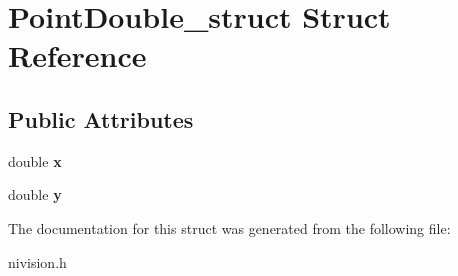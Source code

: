 \hypertarget{structPointDouble__struct}{
\section{PointDouble\_\-struct Struct Reference}
\label{structPointDouble__struct}
}
\subsection*{Public Attributes}
\begin{DoxyCompactItemize}
\item 
\hypertarget{structPointDouble__struct_a6d0ecf84eee110d2ea519a7551f57975}{
double {\bfseries x}}
\label{structPointDouble__struct_a6d0ecf84eee110d2ea519a7551f57975}

\item 
\hypertarget{structPointDouble__struct_ad4630b3fdb9ab500898778e7d4630256}{
double {\bfseries y}}
\label{structPointDouble__struct_ad4630b3fdb9ab500898778e7d4630256}

\end{DoxyCompactItemize}


The documentation for this struct was generated from the following file:\begin{DoxyCompactItemize}
\item 
nivision.h\end{DoxyCompactItemize}
